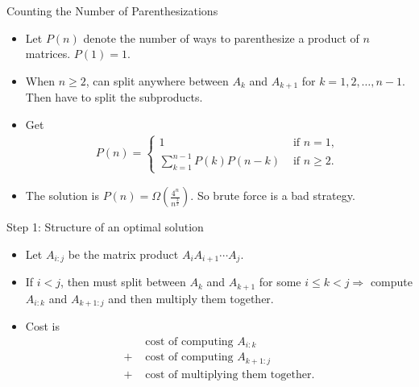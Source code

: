 \documentclass[aspectratio=169]{beamer}
\begin{document}
\begin{frame}{Counting the Number of Parenthesizations}
    \begin{itemize}
        \item Let $P(n)$ denote the number of ways to parenthesize a product of $n$ matrices. $P(1) = 1$.
        \item When $n \geq 2$, can split anywhere between $A_k$ and $A_{k + 1}$ for $k = 1, 2, \ldots, n - 1$. Then have to split the subproducts.
        \item Get
            \begin{equation*}
                \begin{align*}
                    P(n) =
                        \begin{cases}
                            1 & \text{ if } n = 1 \text{, } \\
                            \sum_{k = 1}^{n - 1} P(k)P(n - k) & \text{ if } n \geq 2 \text{.}
                        \end{cases}
                \end{align*}
            \end{equation*}
        \item The solution is $P(n) = \Omega \left( \frac{4^n}{n^{\frac{3}{2}}} \right)$. So brute force is a bad strategy.
    \end{itemize}
\end{frame}

\begin{frame}{Step 1: Structure of an optimal solution}
    \begin{itemize}
        \item Let $A_{i:j}$ be the matrix product $A_i A_{i+1} \cdots A_j$.
        \item If $i < j$, then must split between $A_k$ and $A_{k+1}$ for some $i \leq k < j \Rightarrow$  compute $A_{i:k}$ and $A_{k+1:j}$ and then multiply them together.
        \item Cost is
            \begin{equation*}
                \begin{align*}
                        & \text{ cost of computing } A_{i:k} \\
                    +   & \text{ cost of computing } A_{k+1:j} \\
                    +   & \text{ cost of multiplying them together.}
                \end{align*}
            \end{equation*}
    \end{itemize}
\end{frame}
\end{document}
